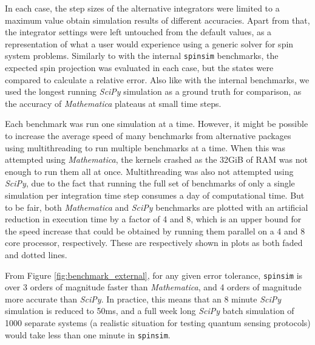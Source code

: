 \documentclass{jors}
\begin{document}
			In each case, the step sizes of the alternative integrators were limited to a maximum value obtain simulation results of different accuracies. Apart from that, the integrator settings were left untouched from the default values, as a representation of what a user would experience using a generic solver for spin system problems. Similarly to with the internal \texttt{spinsim} benchmarks, the expected spin projection was evaluated in each case, but the states were compared to calculate a relative error. Also like with the internal benchmarks, we used the longest running \emph{SciPy} simulation as a ground truth for comparison, as the accuracy of \emph{Mathematica} plateaus at small time steps.

			Each benchmark was run one simulation at a time. However, it might be possible to increase the average speed of many benchmarks from alternative packages using multithreading to run multiple benchmarks at a time. When this was attempted using \emph{Mathematica}, the kernels crashed as the 32GiB of RAM was not enough to run them all at once. Multithreading was also not attempted using \emph{SciPy}, due to the fact that running the full set of benchmarks of only a single simulation per integration time step consumes a day of computational time. But to be fair, both \emph{Mathematica} and \emph{SciPy} benchmarks are plotted with an artificial reduction in execution time by a factor of 4 and 8, which is an upper bound for the speed increase that could be obtained by running them parallel on a 4 and 8 core processor, respectively. These are respectively shown in plots as both faded and dotted lines.

			From Figure \ref{fig:benchmark_external}, for any given error tolerance, \texttt{spinsim} is over 3 orders of magnitude faster than \emph{Mathematica}, and 4 orders of magnitude more accurate than \emph{SciPy}. In practice, this means that an 8 minute \emph{SciPy} simulation is reduced to 50ms, and a full week long \emph{SciPy} batch simulation of 1000 separate systems (a realistic situation for testing quantum sensing protocols) would take less than one minute in \texttt{spinsim}.
\end{document}
